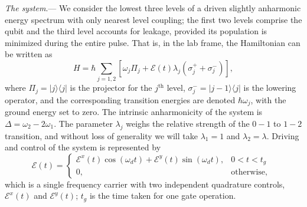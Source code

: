 \documentclass[prl,twocolumn,aps,final,floatfix,superscriptaddress,showpacs]{revtex4}
\newcommand{\bra}[1]{\langle{#1}|}
\newcommand{\ket}[1]{|{#1}\rangle}
\newcommand{\blue}{\color[rgb]{0,0,0.6}}
\renewcommand{\section}[1]{{\em #1}.---}
\begin{document}
\section{The system}
We consider the lowest three levels of a driven slightly anharmonic energy spectrum with only nearest level coupling; the first two levels comprise the qubit and the third level accounts for leakage, provided its population is minimized during the entire pulse.  That is, in the lab frame, the Hamiltonian can be written as 
\begin{equation}
	H = \hbar\sum_{j=1,2}\left[\omega_{j}\Pi_j + \mathcal{E}(t)\lambda_j(\sigma_j^++\sigma_j^-)\right],
\end{equation} 
where $\Pi_j=\ket{j}\bra{j}$ is the projector for the $j^\mathrm{th}$ level, $\sigma_j^-=\ket{j-1}\bra{j}$ is the lowering operator, and the corresponding transition energies are denoted $\hbar\omega_{j}$, with the ground energy set to zero.  The intrinsic anharmonicity of the system is $\Delta=\omega_{2}-2\omega_{1}$. The parameter $\lambda_j$ weighs the relative strength of the $0-1$  to $1-2$ transition, and without loss of generality we will take $\lambda_1=1$ and $\lambda_2=\lambda$. Driving and control of the system is represented by 
\begin{equation}\label{eq:controls}
\mathcal{E}(t)=\begin{cases}
		 \mathcal{E}^x(t)\cos(\omega_d t)+\mathcal{E}^y(t)\sin(\omega_d t), &\text{$0<t<t_g$ }\\
		0, &\text{otherwise,}
	\end{cases}
\end{equation}
 which is a single frequency carrier with two independent quadrature controls, $\mathcal{E}^x(t)$ and $\mathcal{E}^y(t)$; $t_g$ is the time taken for one gate operation. 
 


\end{document}
